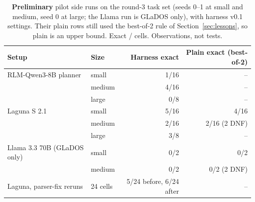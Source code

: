 \begin{table}[t]
\centering\small
\caption{\textbf{Preliminary} pilot side runs on the round-3 task set (seeds 0--1 at small and medium, seed 0 at large; the Llama run is GLaDOS only), with harness v0.1 settings. Their plain rows still used the best-of-2 rule of Section~\ref{sec:lessons}, so plain is an upper bound. Exact / cells. Observations, not tests.}
\label{tab:pilot-side}
\begin{tabular}{llrr}
\toprule
Setup & Size & Harness exact & Plain exact (best-of-2) \\
\midrule
RLM-Qwen3-8B planner & small & 1/16 & -- \\
 & medium & 4/16 & -- \\
 & large & 0/8 & -- \\
\midrule
Laguna S 2.1 & small & 5/16 & 4/16 \\
 & medium & 2/16 & 2/16 (2 DNF) \\
 & large & 3/8 & -- \\
\midrule
Llama 3.3 70B (GLaDOS only) & small & 0/2 & 0/2 \\
 & medium & 0/2 & 0/2 (2 DNF) \\
\midrule
Laguna, parser-fix reruns & 24 cells & 5/24 before, 6/24 after & -- \\
\bottomrule
\end{tabular}
\end{table}
